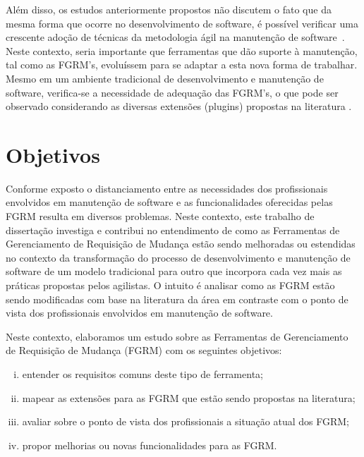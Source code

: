 Além disso, os estudos anteriormente propostos não discutem o fato que da mesma
forma que ocorre no desenvolvimento de software, é possível verificar uma
crescente adoção de técnicas da metodologia ágil na manutenção de
software~\cite{Soltan2016,Devulapally2015, Heeager2015}. Neste contexto, seria
importante que ferramentas que dão suporte à manutenção, tal como as FGRM's,
evoluíssem para se adaptar a esta nova forma de trabalhar. Mesmo em um
ambiente tradicional de  desenvolvimento e manutenção de software, verifica-se a
necessidade de adequação das FGRM's, o que pode ser observado considerando as
diversas extensões (plugins) propostas na literatura
\cite{101186,Thung:2014:BIT:2635868.2661678,Kononenko:2014:DED:2591062.2591075}.

\section{Objetivos}
\label{sec:intro-objetivos}

Conforme exposto o distanciamento entre as necessidades dos profissionais
envolvidos em manutenção de software e as funcionalidades oferecidas pelas FGRM
resulta em diversos problemas. Neste contexto, este trabalho de dissertação
investiga e contribui no entendimento de como as Ferramentas de Gerenciamento de
Requisição de Mudança estão sendo melhoradas ou estendidas no contexto da
transformação do processo de desenvolvimento e manutenção de software de um
modelo tradicional para outro que incorpora cada vez mais as práticas propostas
pelos agilistas. O intuito é analisar como as FGRM estão sendo modificadas com
base na literatura da área em contraste com o ponto de vista dos profissionais
envolvidos em manutenção de software.

Neste contexto, elaboramos um estudo sobre as Ferramentas de Gerenciamento de
Requisição de Mudança (FGRM) com os seguintes objetivos:
\begin{enumerate}[(i)]
	\item entender os requisitos comuns deste tipo de ferramenta;
	\item mapear as extensões para as FGRM que estão sendo propostas na
		literatura;
	\item avaliar sobre o ponto de vista dos profissionais a
		situação atual dos FGRM\@;
	\item propor melhorias ou novas funcionalidades para as FGRM\@.
\end{enumerate}


